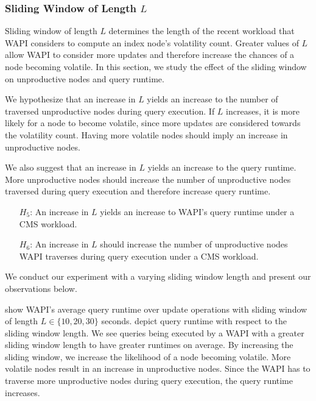 \documentclass[abstracton,12pt]{scrartcl}
\theoremstyle{definition}
\begin{document}
\subsubsection{Sliding Window of Length $L$}

Sliding window of length $L$ determines the length of the recent workload that WAPI
considers to compute an index node's volatility count. Greater values of $L$
allow WAPI to consider more updates and therefore increase the chances of a node
becoming volatile. In this section, we study
the effect of the sliding window on unproductive nodes and query runtime.

We hypothesize that an increase in $L$ yields an increase to the number of
traversed unproductive nodes during query execution. If $L$ increases, it is
more likely for a node to become volatile, since more updates are considered
towards the volatility count.
Having more volatile nodes should imply an increase in unproductive nodes.

We also suggest that an increase in $L$ yields an increase to the query runtime.
More unproductive nodes should increase the number of unproductive nodes traversed
during query execution and therefore increase query runtime.

\begin{shaded}
  \begin{itemize}
  \item[$H_5$:] An increase in $L$ yields an increase to WAPI's query runtime
    under a CMS workload. 
  \item[$H_6$:] An increase in $L$ should increase the number of unproductive
    nodes WAPI traverses during query execution under a CMS workload.
  \end{itemize}
\end{shaded}

We conduct our experiment with a varying sliding window length and present our
observations below.

 show WAPI's average
query runtime over update operations with sliding window of length $L \in \{10, 20,
30\}$ seconds.
 depict query
runtime with respect to the sliding window length. 
We see queries being executed by a WAPI with a greater sliding
window length to have greater runtimes on average. By increasing the sliding
window, we increase the likelihood of a node becoming volatile. More volatile
nodes result in an increase in unproductive nodes. Since the WAPI has to traverse
more unproductive nodes during query execution, the query runtime increases.
\end{document}
